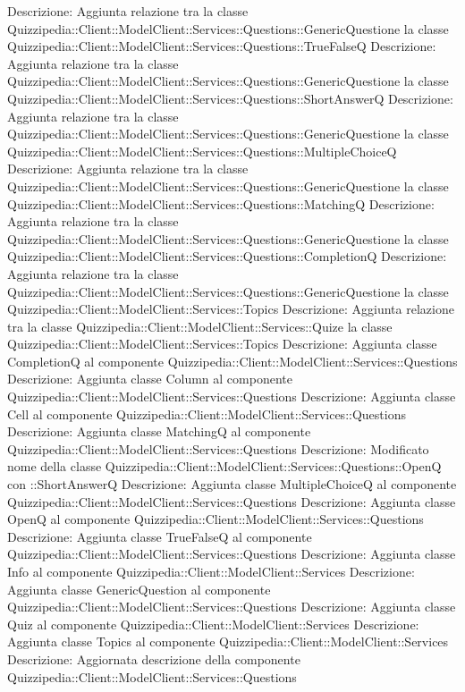 Descrizione: Aggiunta relazione tra la classe Quizzipedia::Client::ModelClient::Services::Questions::GenericQuestione la classe Quizzipedia::Client::ModelClient::Services::Questions::TrueFalseQ 
Descrizione: Aggiunta relazione tra la classe Quizzipedia::Client::ModelClient::Services::Questions::GenericQuestione la classe Quizzipedia::Client::ModelClient::Services::Questions::ShortAnswerQ 
Descrizione: Aggiunta relazione tra la classe Quizzipedia::Client::ModelClient::Services::Questions::GenericQuestione la classe Quizzipedia::Client::ModelClient::Services::Questions::MultipleChoiceQ 
Descrizione: Aggiunta relazione tra la classe Quizzipedia::Client::ModelClient::Services::Questions::GenericQuestione la classe Quizzipedia::Client::ModelClient::Services::Questions::MatchingQ 
Descrizione: Aggiunta relazione tra la classe Quizzipedia::Client::ModelClient::Services::Questions::GenericQuestione la classe Quizzipedia::Client::ModelClient::Services::Questions::CompletionQ 
Descrizione: Aggiunta relazione tra la classe Quizzipedia::Client::ModelClient::Services::Questions::GenericQuestione la classe Quizzipedia::Client::ModelClient::Services::Topics 
Descrizione: Aggiunta relazione tra la classe Quizzipedia::Client::ModelClient::Services::Quize la classe Quizzipedia::Client::ModelClient::Services::Topics 
Descrizione: Aggiunta classe CompletionQ al componente Quizzipedia::Client::ModelClient::Services::Questions 
Descrizione: Aggiunta classe Column al componente Quizzipedia::Client::ModelClient::Services::Questions 
Descrizione: Aggiunta classe Cell al componente Quizzipedia::Client::ModelClient::Services::Questions 
Descrizione: Aggiunta classe MatchingQ al componente Quizzipedia::Client::ModelClient::Services::Questions 
Descrizione: Modificato nome della classe Quizzipedia::Client::ModelClient::Services::Questions::OpenQ con ::ShortAnswerQ 
Descrizione: Aggiunta classe MultipleChoiceQ al componente Quizzipedia::Client::ModelClient::Services::Questions 
Descrizione: Aggiunta classe OpenQ al componente Quizzipedia::Client::ModelClient::Services::Questions 
Descrizione: Aggiunta classe TrueFalseQ al componente Quizzipedia::Client::ModelClient::Services::Questions 
Descrizione: Aggiunta classe Info al componente Quizzipedia::Client::ModelClient::Services 
Descrizione: Aggiunta classe GenericQuestion al componente Quizzipedia::Client::ModelClient::Services::Questions 
Descrizione: Aggiunta classe Quiz al componente Quizzipedia::Client::ModelClient::Services 
Descrizione: Aggiunta classe Topics al componente Quizzipedia::Client::ModelClient::Services 
Descrizione: Aggiornata descrizione della componente Quizzipedia::Client::ModelClient::Services::Questions 
